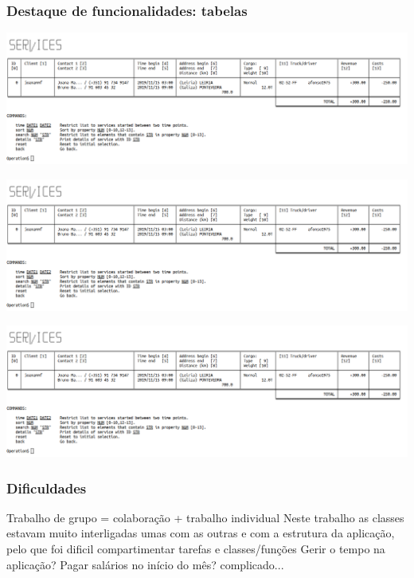 \documentclass{beamer}
\def\\{}
\begin{document}
\begin{frame}
\frametitle{Destaque de funcionalidades: tabelas}
\begin{center} \includegraphics[scale=0.26]{feature1.png} \end{center}
\end{frame}
\begin{frame}
\begin{center} \includegraphics[scale=0.26]{feature1.png} \end{center}
\end{frame}
\begin{frame}
\begin{center} \includegraphics[scale=0.26]{feature1.png} \end{center}
\end{frame}

\begin{frame}
\frametitle{Dificuldades}
Trabalho de grupo = colaboração + trabalho individual\\
Neste trabalho as classes estavam muito interligadas umas com as outras e com a estrutura da aplicação, pelo que foi dificil compartimentar tarefas e classes/funções\\
Gerir o tempo na aplicação? Pagar salários no início do mês? complicado...
\end{frame}
\end{document}
